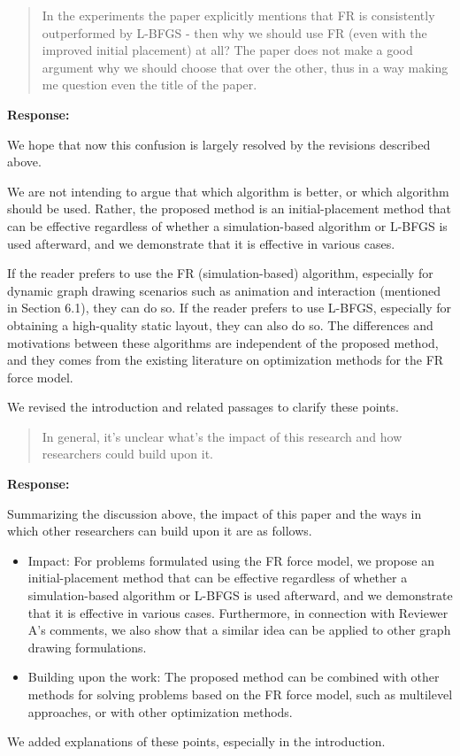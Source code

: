 \documentclass[11pt]{article}
\newcommand{\reviewercomment}[1]{%
  \begin{quote}
  \color{blue}
  #1
  \end{quote}
}
\newenvironment{response}{%
  \noindent\textbf{Response:}%
}{%
  \medskip
}
\begin{document}
\reviewercomment{
  In the experiments the paper explicitly mentions that FR is consistently outperformed by L-BFGS - then why we should use FR (even with the improved initial placement) at all?
  The paper does not make a good argument why we should choose that over the other, thus in a way making me question even the title of the paper.
}
\begin{response}
  We hope that now this confusion is largely resolved by the revisions described above.

  We are not intending to argue that which algorithm is better, or which algorithm should be used. Rather, the proposed method is an initial-placement method that can be effective regardless of whether a simulation-based algorithm or L-BFGS is used afterward, and we demonstrate that it is effective in various cases.

  If the reader prefers to use the FR (simulation-based) algorithm, especially for dynamic graph drawing scenarios such as animation and interaction (mentioned in Section 6.1), they can do so.
  If the reader prefers to use L-BFGS, especially for obtaining a high-quality static layout, they can also do so.
  The differences and motivations between these algorithms are independent of the proposed method, and they comes from the existing literature on optimization methods for the FR force model.

  We revised the introduction and related passages to clarify these points.
\end{response}

\reviewercomment{
  In general, it's unclear what's the impact of this research and how researchers could build upon it.
}

\begin{response}
  Summarizing the discussion above, the impact of this paper and the ways in which other researchers can build upon it are as follows.
  \begin{itemize}
    \item Impact: For problems formulated using the FR force model, we propose an initial-placement method that can be effective regardless of whether a simulation-based algorithm or L-BFGS is used afterward, and we demonstrate that it is effective in various cases. Furthermore, in connection with Reviewer A's comments, we also show that a similar idea can be applied to other graph drawing formulations.
    \item Building upon the work: The proposed method can be combined with other methods for solving problems based on the FR force model, such as multilevel approaches, or with other optimization methods.
  \end{itemize}
  We added explanations of these points, especially in the introduction.
\end{response}
\end{document}
